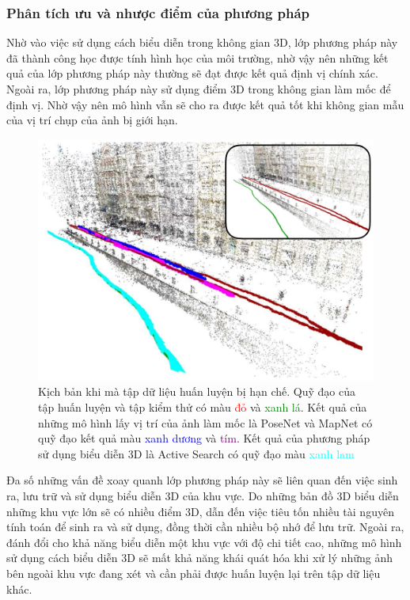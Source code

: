 \subsubsection*{Phân tích ưu và nhược điểm của phương pháp}
Nhờ vào việc sử dụng cách biểu diễn trong không gian 3D, lớp phương pháp này đã thành công học được tính hình học của môi trường, nhờ vậy nên những kết quả của lớp phương pháp này thường sẽ đạt được kết quả định vị chính xác. Ngoài ra, lớp phương pháp này sử dụng điểm 3D trong không gian làm mốc để định vị. Nhờ vậy nên mô hình vẫn sẽ cho ra được kết quả tốt khi không gian mẫu của vị trí chụp của ảnh bị giới hạn.

\begin{figure}[H]
    \centering
    \includegraphics[scale=0.7]{pics/Chapter2/lim.png}
    \caption[Kịch bản so sánh phương pháp 3D và phương pháp sử dụng biểu diễn ngầm \cite{sattler2019understanding}]{Kịch bản khi mà tập dữ liệu huấn luyện bị hạn chế. Quỹ đạo của tập huấn luyện và tập kiểm thử có màu \textcolor{red}{đỏ} và \textcolor{green}{xanh lá}. Kết quả của những mô hình lấy vị trí của ảnh làm mốc là PoseNet \cite{kendall2016posenet} và MapNet \cite{brahmbhatt2018geometryaware} có quỹ đạo kết quả màu \textcolor{blue}{xanh dương} và \textcolor{purple}{tím}. Kết quả của phương pháp sử dụng biểu diễn 3D là Active Search \cite{sattler2016efficient} có quỹ đạo màu \textcolor{cyan}{xanh lam}}
\end{figure}

Đa số những vấn đề xoay quanh lớp phương pháp này sẽ liên quan đến việc sinh ra, lưu trữ và sử dụng biểu diễn 3D của khu vực. Do những bản đồ 3D biểu diễn những khu vực lớn sẽ có nhiều điểm 3D, dẫn đến việc tiêu tốn nhiều tài nguyên tính toán để sinh ra và sử dụng, đồng thời cần nhiều bộ nhớ để lưu trữ. Ngoài ra, đánh đổi cho khả năng biểu diễn một khu vực với độ chi tiết cao, những mô hình sử dụng cách biểu diễn 3D sẽ mất khả năng khái quát hóa khi xử lý những ảnh bên ngoài khu vực đang xét và cần phải được huấn luyện lại trên tập dữ liệu khác.

